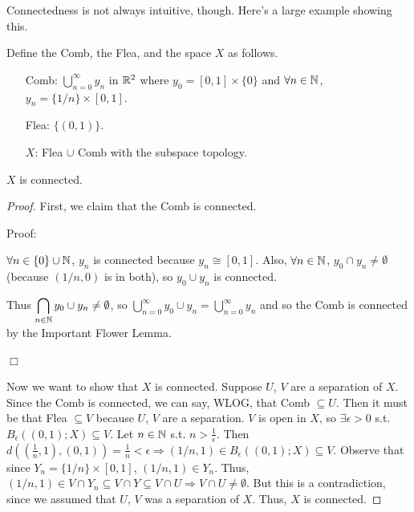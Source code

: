 Connectedness is not always intuitive, though. Here's a large example showing this.

Define the Comb, the Flea, and the space $X$ as follows. 
\begin{itemize}
\item[Comb:] ${\displaystyle\bigcup_{n=0}^{\infty}y_n}$ in $\mathbb R^2$ where $y_0 = [0,1]\times\{0\}$ and $\forall n\in \mathbb N$, $y_n = \{1/n\} \times [0,1]$. 
\item[Flea:] $\{(0,1)\}$. 
\item[$X$:] Flea $\cup$ Comb with the subspace topology. 
\end{itemize}
\begin{example}
$X$ is connected. 
\end{example}
\begin{proof}
First, we claim that the Comb is connected. 

Proof: 

$\forall n \in \{0\} \cup \mathbb N$, $y_n$ is connected because $y_n \cong [0,1]$. Also, $\forall n \in \mathbb N$, $y_0 \cap y_n \neq \emptyset$ (because $(1/n, 0)$ is in both), so $y_0 \cup y_n$ is connected. 

Thus ${\displaystyle\bigcap_{n\in \mathbb N}y_0 \cup y_n} \neq \emptyset$, so ${\displaystyle\bigcup_{n=0}^{\infty}y_0 \cup y_n} = {\displaystyle\bigcup_{n=0}^{\infty}y_n} $ and so the Comb is connected by the Important Flower Lemma. 
\begin{flushright}
$\Box$ 
\end{flushright}

Now we want to show that $X$ is connected. Suppose $U$, $V$ are a separation of $X$. Since the Comb is connected, we can say, WLOG, that Comb $\subseteq U$. Then it must be that Flea $\subseteq V$ because $U$, $V$ are a separation. $V$ is open in $X$, so $\exists \epsilon > 0$ s.t. $B_{\epsilon}((0,1); X) \subseteq V$. Let $n \in \mathbb N$ s.t. $n > \frac{1}{\epsilon}$. Then $d((\frac{1}{n}, 1), (0, 1)) = \frac{1}{n} < \epsilon \Rightarrow (1/n, 1) \in B_{\epsilon}((0,1); X) \subseteq V$. Observe that since $Y_n = \{1/n\} \times [0,1]$, $(1/n, 1) \in Y_n$. Thus, $(1/n, 1) \in V \cap Y_n \subseteq V \cap Y \subseteq V \cap U \Rightarrow V \cap U \neq \emptyset$. But this is a contradiction, since we assumed that $U$, $V$ was a separation of $X$. Thus, $X$ is connected. 
\end{proof}

